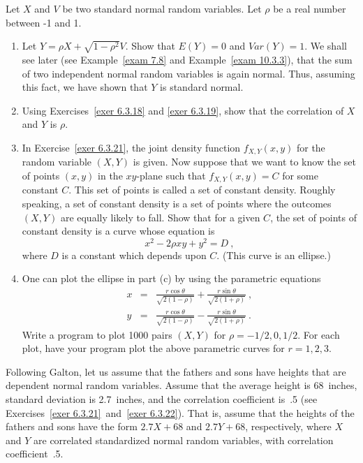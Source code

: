 {\begin{LJSItem}
\istar\label{exer 6.3.24} Let $X$ and $V$ be two standard normal random variables.  Let $\rho$ 
be a real number between -1 and 1.
\begin{enumerate}
\item
Let $Y = \rho X + \sqrt{1 - \rho^2} V$.  Show that $E(Y) = 0$ and $Var(Y) = 1$.  We shall see later
(see Example~\ref{exam 7.8} and Example~\ref{exam 10.3.3}), that the sum of two independent normal
random variables is again normal.  Thus, assuming this fact, we have shown that $Y$ is standard
normal.
\item
Using Exercises~\ref{exer 6.3.18} and \ref{exer 6.3.19}, show that the correlation of $X$
and $Y$ is $\rho$.
\item
In Exercise~\ref{exer 6.3.21}, the joint density function $f_{X,Y}(x, y)$ for the random variable
$(X, Y)$ is given.  Now suppose that we want to know the set of points $(x, y)$ in the $xy$-plane 
such that $f_{X,Y}(x, y) = C$ for some constant $C$.  This set of points is called a set of constant
density.  Roughly speaking, a set of constant density is a set of points where the outcomes $(X, Y)$
are equally likely to fall.  Show that for a given $C$, the set of points of constant density is
a curve whose equation is
$$x^2 - 2\rho x y + y^2 = D\ ,$$
where $D$ is a constant which depends upon $C$.  (This curve is an ellipse.)
\item
One can plot the ellipse in part (c) by using the parametric equations
\begin{eqnarray*} x & = & \frac {r\cos\theta}{\sqrt{2(1 - \rho)}} + \frac
{r\sin\theta}{\sqrt{2(1 +
\rho)}}\ , \\ y & = & \frac {r\cos\theta}{\sqrt{2(1 - \rho)}} - \frac
{r\sin\theta}{\sqrt{2(1 +
\rho)}}\ .
\end{eqnarray*}
Write a program to plot 1000 pairs $(X, Y)$ for $\rho = -1/2, 0, 1/2$.  For each plot,
have your program plot the above parametric curves for $r = 1, 2, 3$.
\end{enumerate}

\istar\label{exer 6.3.25} Following Galton, let us assume that the fathers and sons
have heights that are dependent normal random variables.  Assume that the average
height is 68~inches, standard deviation is 2.7~inches, and the correlation coefficient
is~.5 (see Exercises~\ref{exer 6.3.21}~and~\ref{exer 6.3.22}).  That is, assume that
the heights of the fathers and sons have the form $2.7X + 68$ and $2.7Y + 68$,
respectively, where $X$ and $Y$ are correlated standardized normal random variables,
with correlation coefficient~.5.


\end{LJSItem}}
